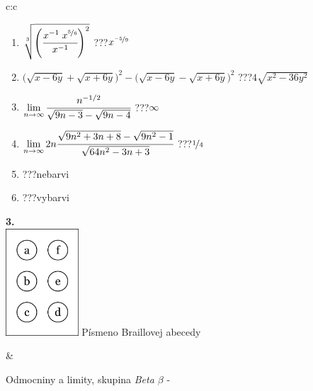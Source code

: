 \documentclass[10pt]{report}
\begin{document}
\begin{tabular}{c:c}
\begin{minipage}[c][104.5mm][t]{0.5\linewidth}
\begin{center}
\begin{minipage}{0.79\linewidth}
\begin{center}
\begin{varwidth}{\linewidth}
\begin{enumerate}
\small
\item $\sqrt[3]{\left(\cfrac{x^{-1}\;x^{\nicefrac{5}{6}}}{x^{-1}}\right)^{2}}$\quad \dotfill\; ???\;\dotfill \quad $x^{\nicefrac{-5}{9}}$
\item {\footnotesize{\scriptsize$\big(\sqrt{x-6y}+\sqrt{x+6y}\big)^2-\big(\sqrt{x-6y}-\sqrt{x+6y}\big)^2$}\quad \dotfill\; ???\;\dotfill \quad $4\sqrt{x^2-36y^2}$}
\item $\lim\limits_{n\to\infty}\cfrac{n^{-1/2}}{\sqrt{9n-3}-\sqrt{9n-4}}$\quad \dotfill\; ???\;\dotfill \quad $\infty$
\item $\lim\limits_{n\to\infty}2n\cfrac{\sqrt{9n^2+3n+8}-\sqrt{9n^2-1}}{\sqrt{64n^2-3n+3}}$\quad \dotfill\; ???\;\dotfill \quad $\nicefrac{1}{4}$
\item \quad \dotfill\; ???\;\dotfill \quad nebarvi
\item \quad \dotfill\; ???\;\dotfill \quad vybarvi
\end{enumerate}
\end{varwidth}
\end{center}
\end{minipage}
\begin{minipage}{0.20\linewidth}
\begin{center}
{\Huge\bfseries 3.} \\[2mm]
\includegraphics[height=40mm]{../images/braille.png}
{\small Písmeno Braillovej abecedy}
\end{center}
\end{minipage}
\end{center}
\end{minipage}
&
\begin{minipage}[c][104.5mm][t]{0.5\linewidth}
\begin{center}
\vspace{7mm}
{\huge Odmocniny a limity, skupina \textit{Beta $\beta$} -}\\[5mm]

\end{center}
\end{minipage}
\end{tabular}
\end{document}
